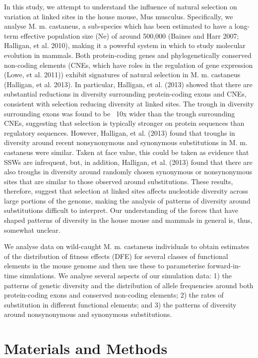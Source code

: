 In this study, we attempt to understand the influence of natural selection on variation at linked sites in the house mouse, Mus musculus. Specifically, we analyse M. m. castaneus, a sub-species which has been estimated to have a long-term effective population size (Ne) of around 500,000 (Baines and Harr 2007; Halligan, et al. 2010), making it a powerful system in which to study molecular evolution in mammals. Both protein-coding genes and phylogenetically conserved non-coding elements (CNEs, which have roles in the regulation of gene expression (Lowe, et al. 2011)) exhibit signatures of natural selection in M. m. castaneus (Halligan, et al. 2013). In particular, Halligan, et al. (2013) showed that there are substantial reductions in diversity surrounding protein-coding exons and CNEs, consistent with selection reducing diversity at linked sites. The trough in diversity surrounding exons was found to be ~10x wider than the trough surrounding CNEs, suggesting that selection is typically stronger on protein sequences than regulatory sequences. However, Halligan, et al. (2013) found that troughs in diversity around recent nonsynonymous and synonymous substitutions in M. m. castaneus were similar. Taken at face value, this could be taken as evidence that SSWs are infrequent, but, in addition, Halligan, et al. (2013) found that there are also troughs in diversity around randomly chosen synonymous or nonsynonymous sites that are similar to those observed around substitutions. These results, therefore, suggest that selection at linked sites affects nucleotide diversity across large portions of the genome, making the analysis of patterns of diversity around substitutions difficult to interpret. Our understanding of the forces that have shaped patterns of diversity in the house mouse and mammals in general is, thus, somewhat unclear.

We analyse data on wild-caught M. m. castaneus individuals to obtain estimates of the distribution of fitness effects (DFE) for several classes of functional elements in the mouse genome and then use these to parameterise forward-in-time simulations. We analyse several aspects of our simulation data: 1) the patterns of genetic diversity and the distribution of allele frequencies around both protein-coding exons and conserved non-coding elements; 2) the rates of substitution in different functional elements; and 3) the patterns of diversity around nonsynonymous and synonymous substitutions.

\section{Materials and Methods}
